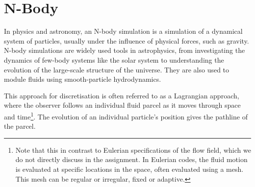 
\section{N-Body}
\label{sec:nbody}
In physics and astronomy, an N-body simulation is a simulation of a dynamical system of particles, usually under the influence of physical forces, such as gravity. N-body simulations are widely used tools in astrophysics, from investigating the dynamics of few-body systems like the solar system to understanding the evolution of the large-scale structure of the universe. They are also used to module fluids using smooth-particle hydrodynamics. 

\par 
This approach for discretisation is often referred to as a Lagrangian approach, where the observer follows an individual fluid parcel as it moves through space and time\footnote{Note that this in contrast to Eulerian specifications of the flow field, which we do not directly discuss in the assignment. In Eulerian codes, the fluid motion is evaluated at specific locations in the space, often evaluated using a mesh. This mesh can be regular or irregular, fixed or adaptive.}. The evolution of an individual particle's position gives the pathline of the parcel. 

